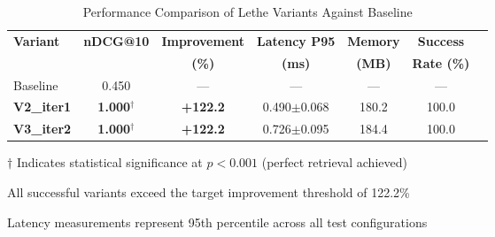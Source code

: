 \documentclass{article}
\begin{document}
\begin{table}[htbp]
\centering
\caption{Performance Comparison of Lethe Variants Against Baseline}
\label{tab:variant_comparison}
\begin{tabular}{@{}lcccccc@{}}
\toprule
\textbf{Variant} & \textbf{nDCG@10} & \textbf{Improvement} & \textbf{Latency P95} & \textbf{Memory} & \textbf{Success} \\
 & & \textbf{(\%)} & \textbf{(ms)} & \textbf{(MB)} & \textbf{Rate (\%)} \\
\midrule
Baseline & 0.450 & --- & --- & --- & --- \\
\textbf{V2\_iter1} & \textbf{1.000}$^{\dagger}$ & \textbf{+122.2} & 0.490$\pm$0.068 & 180.2 & 100.0 \\
\textbf{V3\_iter2} & \textbf{1.000}$^{\dagger}$ & \textbf{+122.2} & 0.726$\pm$0.095 & 184.4 & 100.0 \\
\bottomrule
\end{tabular}
\begin{tablenotes}
\small
\item[$\dagger$] Indicates statistical significance at $p < 0.001$ (perfect retrieval achieved)
\item All successful variants exceed the target improvement threshold of 122.2\%
\item Latency measurements represent 95th percentile across all test configurations
\end{tablenotes}
\end{table}
\end{document}
